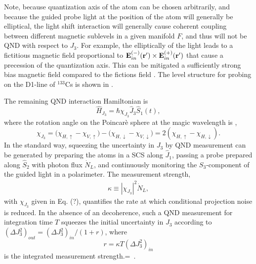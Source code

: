 \documentclass[preprint,aps,pra,onecolumn]{revtex4-1} %
\newcommand{\jz}{\hat{J}_3}
\newcommand{\comment}[1]{{\color{Maroon} #1}}
\begin{document}
Note, because quantization axis of the atom can be chosen arbitrarily, and because the guided probe light at the position of the atom will generally be elliptical, the light shift interaction will generally cause coherent coupling between different magnetic sublevels in a given manifold $F$, and thus will not be QND with respect to $J_3$.  For example, the elliptically of the light leads to a fictitious magnetic field proportional to $\mathbf{E}^{(-)}_{in}(\mathbf{r}') \times \mathbf{E}^{(+)}_{in}(\mathbf{r}')$ that cause a precession of the quantization axis.  This can be mitigated a sufficiently strong bias magnetic field compared to the fictions field \cite{smith_continuous_2004}. 
The level structure for probing on the D1-line of $^{133}$Cs is shown in .  

The remaining QND interaction Hamiltonian is
	\begin{equation} \label{Eq::FaradayHam}
		\hat{H}_{J_3} = \hbar \chi_{J_3} \jz \hat{S}_1(t),
	\end{equation}
where the rotation angle on the Poincar\`{e} sphere at the magic wavelength is ,
\begin{equation}
\chi_{J_3} = \big( \chi_{H, \uparrow} - \chi_{V,\uparrow} \big) - \big(\chi_{H,\downarrow} - \chi_{V,\downarrow} \big) = 2(\chi_{H, \uparrow}-\chi_{H, \downarrow}).
\end{equation}
In the standard way, squeezing the uncertainty in $J_3$ by QND measurement can be generated by preparing the atoms in a SCS along $\hat{J}_1$,
passing a probe prepared along $\hat{S}_2$ with photon flux $\dot{N}_L$, and continuously monitoring the $S_3$-component of the guided light in a polarimeter. The measurement strength,
	\begin{align} \label{Eq::MeasurementStrength}
		\kappa \equiv |\chi_{J_3}|^2 \dot{N}_L, 
	\end{align}
with $\chi_{J_3}$ given in Eq. (?), quantifies the rate at which conditional projection noise is reduced. 
In the absence of an decoherence, such a QND measurement for integration time $T$ squeezes the initial uncertainty in $J_3$ according to $(\Delta J_3^2)_{out}= (\Delta J_3^2)_{in}/(1+r)$, where
\begin{equation}
r = \kappa T  (\Delta J_3^2)_{in}
\end{equation}
is the integrated measurement strength.=~\cite{?}.
\end{document}
